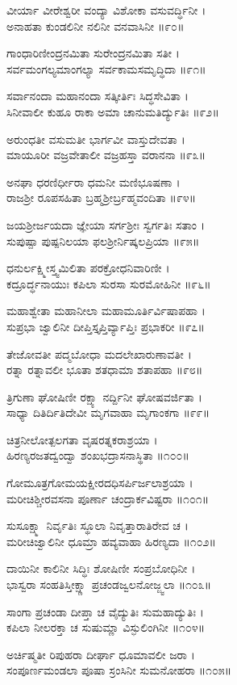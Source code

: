 ವೀರ್ಯಾ ವೀರೇಶ್ವರೀ ವಂದ್ಯಾ ವಿಶೋಕಾ ವಸುವರ್ದ್ಧಿನೀ ।\\
ಅನಾಹತಾ ಕುಂಡಲಿನೀ ನಲಿನೀ ವನವಾಸಿನೀ ॥೯೦॥

ಗಾಂಧಾರಿಣೀಂದ್ರನಮಿತಾ ಸುರೇಂದ್ರನಮಿತಾ ಸತೀ ।\\
ಸರ್ವಮಂಗಲ್ಯಮಾಂಗಲ್ಯಾ ಸರ್ವಕಾಮಸಮೃದ್ಧಿದಾ ॥೯೧॥

ಸರ್ವಾನಂದಾ ಮಹಾನಂದಾ ಸತ್ಕೀರ್ತಿಃ ಸಿದ್ಧಸೇವಿತಾ ।\\
ಸಿನೀವಾಲೀ ಕುಹೂ ರಾಕಾ ಅಮಾ ಚಾನುಮತಿರ್ದ್ಯುತಿಃ ॥೯೨॥

ಅರುಂಧತೀ ವಸುಮತೀ ಭಾರ್ಗವೀ ವಾಸ್ತುದೇವತಾ ।\\
ಮಾಯೂರೀ ವಜ್ರವೇತಾಲೀ ವಜ್ರಹಸ್ತಾ ವರಾನನಾ ॥೯೩॥

ಅನಘಾ ಧರಣಿರ್ಧೀರಾ ಧಮನೀ ಮಣಿಭೂಷಣಾ ।\\
ರಾಜಶ್ರೀ ರೂಪಸಹಿತಾ ಬ್ರಹ್ಮಶ್ರೀರ್ಬ್ರಹ್ಮವಂದಿತಾ ॥೯೪॥

ಜಯಶ್ರೀರ್ಜಯದಾ ಜ್ಞೇಯಾ ಸರ್ಗಶ್ರೀಃ ಸ್ವರ್ಗತಿಃ ಸತಾಂ ।\\
ಸುಪುಷ್ಪಾ ಪುಷ್ಪನಿಲಯಾ ಫಲಶ್ರೀರ್ನಿಷ್ಕಲಪ್ರಿಯಾ ॥೯೫॥

ಧನುರ್ಲಕ್ಷ್ಮೀಸ್ತ್ವಮಿಲಿತಾ ಪರಕ್ರೋಧನಿವಾರಿಣೀ ।\\
ಕದ್ರೂರ್ದ್ಧನಾಯುಃ ಕಪಿಲಾ ಸುರಸಾ ಸುರಮೋಹಿನೀ ॥೯೬॥

ಮಹಾಶ್ವೇತಾ ಮಹಾನೀಲಾ ಮಹಾಮೂರ್ತಿರ್ವಿಷಾಪಹಾ ।\\
ಸುಪ್ರಭಾ ಜ್ವಾಲಿನೀ ದೀಪ್ತಿಸ್ತೃಪ್ತಿರ್ವ್ಯಾಪ್ತಿಃ ಪ್ರಭಾಕರೀ ॥೯೭॥

ತೇಜೋವತೀ ಪದ್ಮಬೋಧಾ ಮದಲೇಖಾರುಣಾವತೀ ।\\
ರತ್ನಾ ರತ್ನಾವಲೀ ಭೂತಾ ಶತಧಾಮಾ ಶತಾಪಹಾ ॥೯೮॥

ತ್ರಿಗುಣಾ ಘೋಷಿಣೀ ರಕ್ಷ್ಯಾ ನರ್ದ್ದಿನೀ ಘೋಷವರ್ಜಿತಾ ।\\
ಸಾಧ್ಯಾ ದಿತಿರ್ದಿತಿದೇವೀ ಮೃಗವಾಹಾ ಮೃಗಾಂಕಗಾ ॥೯೯॥

ಚಿತ್ರನೀಲೋತ್ಪಲಗತಾ ವೃಷರತ್ನಕರಾಶ್ರಯಾ ।\\
ಹಿರಣ್ಯರಜತದ್ವಂದ್ವಾ ಶಂಖಭದ್ರಾಸನಾಸ್ಥಿತಾ ॥೧೦೦॥

ಗೋಮೂತ್ರಗೋಮಯಕ್ಷೀರದಧಿಸರ್ಪಿರ್ಜಲಾಶ್ರಯಾ ।\\
ಮರೀಚಿಶ್ಚೀರವಸನಾ ಪೂರ್ಣಾ ಚಂದ್ರಾರ್ಕವಿಷ್ಟರಾ ॥೧೦೧॥

ಸುಸೂಕ್ಷ್ಮಾ ನಿರ್ವೃತಿಃ ಸ್ಥೂಲಾ ನಿವೃತ್ತಾರಾತಿರೇವ ಚ ।\\
ಮರೀಚಿಜ್ವಾಲಿನೀ ಧೂಮ್ರಾ ಹವ್ಯವಾಹಾ ಹಿರಣ್ಯದಾ ॥೧೦೨॥

ದಾಯಿನೀ ಕಾಲಿನೀ ಸಿದ್ಧಿಃ ಶೋಷಿಣೀ ಸಂಪ್ರಬೋಧಿನೀ ।\\
ಭಾಸ್ವರಾ ಸಂಹತಿಸ್ತೀಕ್ಷ್ಣಾ ಪ್ರಚಂಡಜ್ವಲನೋಜ್ಜ್ವಲಾ ॥೧೦೩॥

ಸಾಂಗಾ ಪ್ರಚಂಡಾ ದೀಪ್ತಾ ಚ ವೈದ್ಯುತಿಃ ಸುಮಹಾದ್ಯುತಿಃ ।\\
ಕಪಿಲಾ ನೀಲರಕ್ತಾ ಚ ಸುಷುಮ್ಣಾ ವಿಸ್ಫುಲಿಂಗಿನೀ ॥೧೦೪॥

ಅರ್ಚಿಷ್ಮತೀ ರಿಪುಹರಾ ದೀರ್ಘಾ ಧೂಮಾವಲೀ ಜರಾ ।\\
ಸಂಪೂರ್ಣಮಂಡಲಾ ಪೂಷಾ ಸ್ರಂಸಿನೀ ಸುಮನೋಹರಾ ॥೧೦೫॥

